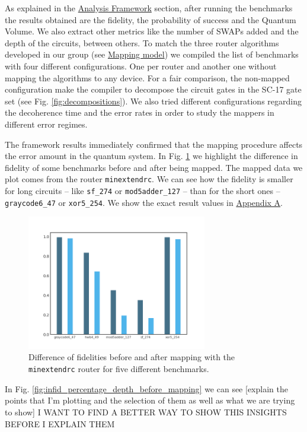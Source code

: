 \label{tab:map_selected_benchs}

As explained in the \href{chapter-4.org}{Analysis Framework} section, after running the benchmarks the results obtained are the fidelity, the probability of success and the Quantum Volume.
We also extract other metrics like the number of SWAPs added and the depth of the circuits, between others.
To match the three router algorithms developed in our group (see \href{chapter-3.org}{Mapping model}) we compiled the list of benchmarks with four different configurations.
One per router and another one without mapping the algorithms to any device.
For a fair comparison, the non-mapped configuration make the compiler to decompose the circuit gates in the SC-17 gate set (see Fig. \ref{fig:decompositions}).
We also tried different configurations regarding the decoherence time and the error rates in order to study the mappers in different error regimes.


The framework results immediately confirmed that the mapping procedure affects the error amount in the quantum system.
In Fig. \ref{fig:f_diff_bar_plot} we highlight the difference in fidelity of some benchmarks before and after being mapped.
The mapped data we plot comes from the router \texttt{minextendrc}.
We can see how the fidelity is smaller for long circuits -- like \texttt{sf\_274} or \texttt{mod5adder\_127} -- than for the short ones -- \texttt{graycode6\_47} or \texttt{xor5\_254}.
We show the exact result values in \href{appendix-1.org}{Appendix A}.

\begin{figure}[htbp]
\centering
\includegraphics[width=0.7\textwidth]{figures/f_diff_bar_plot.png}
\caption{\label{fig:f_diff_bar_plot}
Difference of fidelities before and after mapping with the \texttt{minextendrc} router for five different benchmarks.}
\end{figure}
In Fig. \ref{fig:infid_percentage_depth_before_mapping} we can see [explain the points that I'm plotting and the selection of them as well as what we are trying to show]
I WANT TO FIND A BETTER WAY TO SHOW THIS INSIGHTS BEFORE I EXPLAIN THEM

